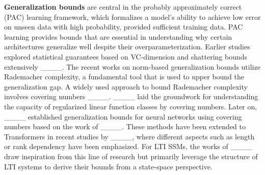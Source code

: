\textbf{Generalization bounds} are central in the probably approximately correct (PAC) learning framework, which formalizes a model's ability to achieve  low error on unseen data with high probability, provided sufficient training data. PAC learning provides bounds that are essential in understanding why certain architectures generalize well despite their overparameterization. Earlier studies explored statistical guarantees based on VC-dimension and shattering bounds extensively ____. The recent works on norm-based generalization bounds utilize Rademacher complexity, a fundamental tool that is used to upper bound the generalization gap. A widely used approach to bound Rademacher complexity involves covering numbers ____. ____ laid the groundwork for understanding the capacity of regularized linear function classes by covering numbers. Later on, ____ established generalization bounds for neural networks using covering numbers based on the work of ____. These methods have been extended to Transformers in recent studies by ____, where different aspects such as length or rank dependency have been emphasized. For LTI SSMs, the works of ____ draw inspiration from this line of research but primarily leverage the structure of LTI systems to derive their bounds from a state-space perspective.